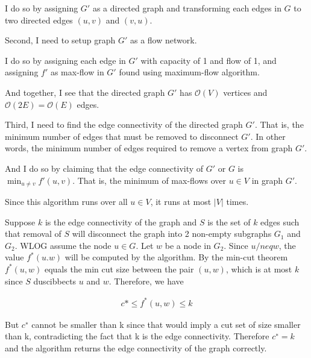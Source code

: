 \documentclass[12pt]{article}
\begin{document}
\begin{enumerate}[1.]
\begin{mdframed}
    \bigskip

    I do so by assigning $G'$ as a directed graph and transforming each edges in $G$
    to two directed edges $(u,v)$ and $(v,u)$.

    \bigskip

    Second, I need to setup graph $G'$ as a flow network.

    \bigskip

    I do so by assigning each edge in $G'$ with capacity of 1 and flow of 1, and
    assigning $f'$ as max-flow in $G'$ found using maximum-flow algorithm.

    \bigskip

    And together, I see that the directed graph $G'$ has $\mathcal{O}(V)$ vertices
    and $\mathcal{O}(2E) = \mathcal{O}(E)$ edges.

    \bigskip

    Third, I need to find the edge connectivity of the directed graph $G'$. That is, the minimum number of edges
    that must be removed to disconnect $G'$. In other words, the minimum number of edges
    required to remove a vertex from graph $G'$.

    \bigskip

    And I do so by claiming that the edge connectivity of $G'$ or $G$ is
    $\min_{u \neq v} f'(u,v)$. That is, the minimum of max-flows over $u \in V$ in graph $G'$.

    \bigskip

    Since this algorithm runs over all $u \in V$, it runs at most $\lvert V \rvert$ times.

    \bigskip

    \end{mdframed}

    Suppose $k$ is the edge connectivity of the graph and $S$ is the set of $k$
    edges such that removal of $S$ will disconnect the graph into
    2 non-empty subgraphs $G_1$ and $G_2$. WLOG assume the node $u \in G$.
    Let $w$ be a node in $G_2$. Since $u /neq w$, the value $f^*(u.w)$ will be computed
    by the algorithm. By the min-cut theorem $f^*(u,w)$ equals the min cut size
    between the pair $(u,w)$, which is at most $k$ since $S$ duscibbects $u$ and $w$.
    Therefore, we have

    \begin{align}
        c* \leq f^*(u,w) \leq k
    \end{align}

    But $c^{∗}$ cannot be smaller than k since that would imply a cut set of size smaller than k,
    contradicting the fact that k is the edge connectivity. Therefore $c^{∗} = k$ and the algorithm
    returns the edge connectivity of the graph correctly.


\end{enumerate}
\end{document}
